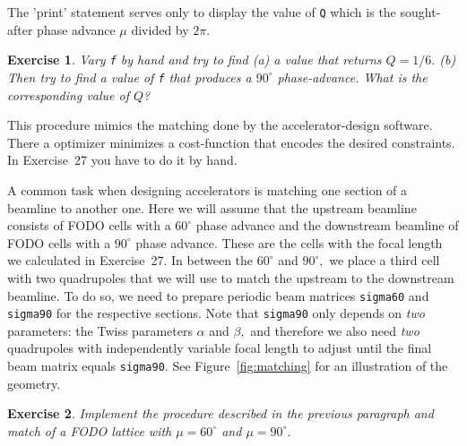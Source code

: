 \documentclass{article}
\newtheorem{exercise}{Exercise}
\begin{document}
The 'print' statement serves only to display the value of {\tt Q} which is 
the sought-after phase advance $\mu$ divided by $2\pi.$

\begin{exercise}
Vary {\tt f} by hand and try to find (a) a value that returns $Q=1/6.$ (b) Then try to find a value of {\tt f} that produces a $90^\circ$ phase-advance. What is the corresponding value of $Q$?
\end{exercise}

This procedure mimics the matching done by the accelerator-design software. There
a optimizer minimizes a cost-function that encodes the desired constraints. In
Exercise~27 you have to do it by hand.
\par
A common task when designing accelerators is matching one section of a beamline
to another one. Here we will assume that the upstream beamline consists of
FODO cells with a $60^\circ$ phase advance and the downstream beamline of FODO cells 
with a $90^\circ$ phase advance. These are the cells with the focal length we calculated
in Exercise~27. In between the $60^\circ$ and $90^\circ,$ we place a third cell with two
quadrupoles that we will use to match the upstream to the downstream beamline.
To do so, we need to prepare periodic beam matrices {\tt sigma60} and
{\tt sigma90} for the respective sections. Note that {\tt sigma90} only depends 
on {\em two} parameters: the Twiss parameters $\alpha$ and $\beta,$ and therefore we 
also need {\em two} quadrupoles with independently variable focal length to adjust
until the final beam matrix equals {\tt sigma90}. See Figure~\ref{fig:matching}
for an illustration of the geometry.

\begin{exercise}
Implement the procedure described in the previous paragraph and match of a FODO lattice with $\mu=60^\circ$ and $\mu=90^\circ$.
\end{exercise}
\end{document}
